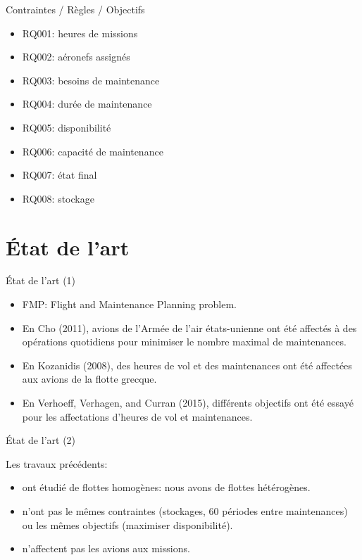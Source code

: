 \documentclass[ignorenonframetext,]{beamer}
\providecommand{\tightlist}{%
  \setlength{\itemsep}{0pt}\setlength{\parskip}{0pt}}
\begin{document}
\begin{frame}{Contraintes / Règles / Objectifs}

\begin{itemize}[<+->]
\tightlist
\item
  RQ001: heures de missions
\item
  RQ002: aéronefs assignés
\item
  RQ003: besoins de maintenance
\item
  RQ004: durée de maintenance
\item
  RQ005: disponibilité
\item
  RQ006: capacité de maintenance
\item
  RQ007: état final
\item
  RQ008: stockage
\end{itemize}

\end{frame}

\section{État de l'art}\label{etat-de-lart}

\begin{frame}{État de l'art (1)}

\begin{itemize}[<+->]
\tightlist
\item
  FMP: Flight and Maintenance Planning problem.
\item
  En Cho (2011), avions de l'Armée de l'air états-unienne ont été
  affectés à des opérations quotidiens pour minimiser le nombre maximal
  de maintenances.
\item
  En Kozanidis (2008), des heures de vol et des maintenances ont été
  affectées aux avions de la flotte grecque.
\item
  En Verhoeff, Verhagen, and Curran (2015), différents objectifs ont été
  essayé pour les affectations d'heures de vol et maintenances.
\end{itemize}

\end{frame}

\begin{frame}{État de l'art (2)}

Les travaux précédents:

\begin{itemize}[<+->]
\tightlist
\item
  ont étudié de flottes homogènes: nous avons de flottes hétérogènes.
\item
  n'ont pas le mêmes contraintes (stockages, 60 périodes entre
  maintenances) ou les mêmes objectifs (maximiser disponibilité).
\item
  n'affectent pas les avions aux missions.
\end{itemize}

\end{frame}
\end{document}
